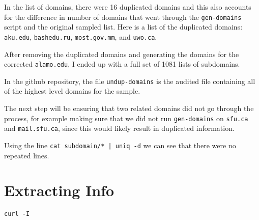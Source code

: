 \documentclass{article}
\theoremstyle{definition}
\begin{document}
\begin{flushleft}
In the list of domains, there were 16 duplicated domains and this
also accounts for the difference in number of domains that went
through the \texttt{gen-domains} script and the original sampled
list. Here is a list of the duplicated domains: \texttt{aku.edu},
\texttt{bashedu.ru}, \texttt{most.gov.mm}, and \texttt{uwo.ca}.

After removing the duplicated domains and generating the domains
for the corrected \texttt{alamo.edu}, I ended up with a full set
of 1081 lists of subdomains.

In the github repository, the file \texttt{undup-domains} is the audited file containing all
of the highest level domains for the sample.

The next step will be ensuring that two related domains did not go through
the process, for example making sure that we did not run \texttt{gen-domains}
on \texttt{sfu.ca} and \texttt{mail.sfu.ca}, since this would likely result in
duplicated information.

Using the line \texttt{cat subdomain/* | uniq -d} we can see that
there were no repeated lines.

\section{Extracting Info}
\texttt{curl -I}


\end{flushleft}
\printbibliography
\end{document}
